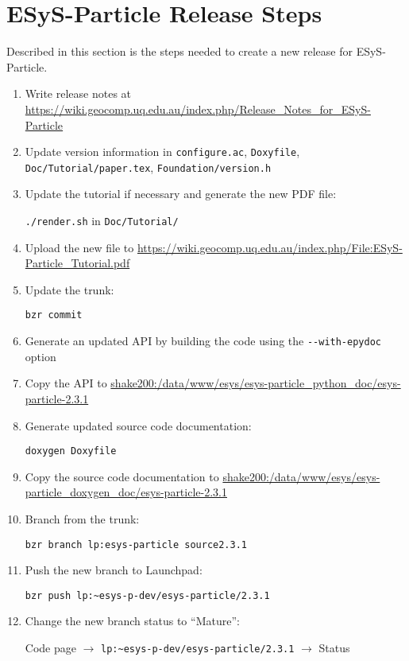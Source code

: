 
\chapter{ESyS-Particle Release Steps}
\label{cha:esys_particle_release_steps}

Described in this section is the steps needed to create a new release for ESyS-Particle.
\begin{enumerate}
    \item Write release notes at \url{https://wiki.geocomp.uq.edu.au/index.php/Release_Notes_for_ESyS-Particle}
    \item Update version information in \lstinline{configure.ac}, \lstinline{Doxyfile}, \lstinline{Doc/Tutorial/paper.tex}, \lstinline{Foundation/version.h}
    \item Update the tutorial if necessary and generate the new PDF file:

    \lstinline{./render.sh} in \lstinline{Doc/Tutorial/}
    \item Upload the new file to \url{https://wiki.geocomp.uq.edu.au/index.php/File:ESyS-Particle_Tutorial.pdf}
    \item Update the trunk:

    \lstinline{bzr commit}
    \item Generate an updated API by building the code using the \lstinline{--with-epydoc} option
    \item Copy the API to \url{shake200:/data/www/esys/esys-particle_python_doc/esys-particle-2.3.1}
    \item Generate updated source code documentation:

    \lstinline{doxygen Doxyfile}
    \item Copy the source code documentation to \url{shake200:/data/www/esys/esys-particle_doxygen_doc/esys-particle-2.3.1}
    \item Branch from the trunk:

    \lstinline{bzr branch lp:esys-particle source2.3.1}
    \item Push the new branch to Launchpad:

    \lstinline{bzr push lp:~esys-p-dev/esys-particle/2.3.1}
    \item Change the new branch status to ``Mature'':

    Code page $\rightarrow$ \lstinline{lp:~esys-p-dev/esys-particle/2.3.1} $\rightarrow$ Status

\end{enumerate}


